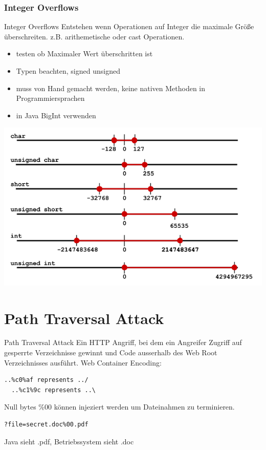 \documentclass[10pt]{beamer}
\begin{document}
\subsubsection{Integer Overflows}

\begin{frame}[fragile]{Integer Overflows}
  Entstehen wenn Operationen auf Integer die maximale Gr\"o{\ss}e \"uberschreiten. z.B. arithemetische oder cast Operationen.
  \begin{itemize}
    \item testen ob Maximaler Wert \"uberschritten ist
    \item Typen beachten, signed unsigned
    \item muss von Hand gemacht werden, keine nativen Methoden in Programmiersprachen
    \item in Java BigInt verwenden
  \end{itemize}
  \includegraphics[scale=0.25]{integer_overflow}
\end{frame}



\section{Path Traversal Attack}

\begin{frame}[fragile]{Path Traversal Attack}
  Ein HTTP Angriff, bei dem ein Angreifer Zugriff auf gesperrte Verzeichnisse gewinnt und Code ausserhalb des Web Root Verzeichnisses ausf\"uhrt.
  \newline
  \newline
  Web Container Encoding:
  \begin{lstlisting}[style=BashStyle]
  ..%c0%af represents ../
  ..%c1%9c represents ..\
  \end{lstlisting}

  Null bytes \%00 k\"onnen injeziert werden um Dateinahmen zu terminieren.
  \begin{lstlisting}[style=BashStyle]
  ?file=secret.doc%00.pdf
  \end{lstlisting}
  Java sieht .pdf, Betriebssystem sieht .doc
\end{frame}
\end{document}
